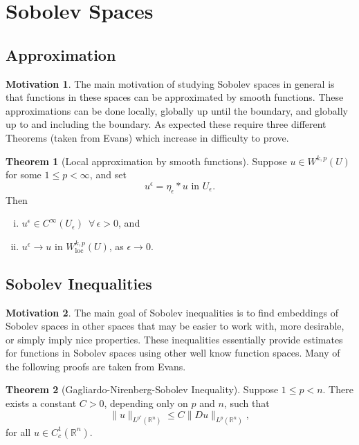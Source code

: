 \documentclass[11pt]{article}
\theoremstyle{definition}
\newtheorem*{theorem}{Theorem}
\newtheorem*{motivation}{Motivation}
\begin{document}
\newpage

\section{Sobolev Spaces}

\subsection{Approximation}
\begin{motivation}
The main motivation of studying Sobolev spaces in general is that functions in these spaces can be approximated by smooth functions.
These approximations can be done locally, globally up until the boundary, and globally up to and including the boundary.
As expected these require three different Theorems (taken from Evans) which increase in difficulty to prove.
\end{motivation}
\begin{theorem}[Local approximation by smooth functions]
Suppose $u \in W^{k,p}(U)$ for some $1 \leq p < \infty$, and set
	\[u^{\epsilon} = \eta_{\epsilon} * u \text{ in } U_{\epsilon}.\]
Then
	\begin{enumerate}[(i)]
		\item $u^{\epsilon} \in C^{\infty}(U_{\epsilon}) \,\,\, \forall \, \epsilon > 0$, and
		\item $u^{\epsilon} \rightarrow u \text{ in } W_{\text{loc}}^{k,p}(U)$, as $\epsilon \rightarrow 0$.
	\end{enumerate}
\end{theorem}

\subsection{Sobolev Inequalities}
\begin{motivation}
The main goal of Sobolev inequalities is to find embeddings of Sobolev spaces in other spaces that may be easier to work with, more desirable,
or simply imply nice properties. These inequalities essentially provide estimates for functions in Sobolev spaces using other
well know function spaces. Many of the following proofs are taken from Evans.
\end{motivation}
\begin{theorem}[Gagliardo-Nirenberg-Sobolev Inequality]
Suppose $1\leq p < n$. There exists a constant $C > 0$, depending only on $p$ and $n$, such that
	\[\|u\|_{L^{p^*}(\mathbb{R}^n)} \leq C\|Du\|_{L^{p}(\mathbb{R}^n)},\]
for all $u \in C_{c}^{1}(\mathbb{R}^n)$.
\end{theorem}
\end{document}
